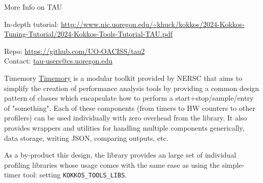 \begin{frame}[fragile]{More Info on TAU}

\begin{center}
	In-depth tutorial: \url{http://www.nic.uoregon.edu/~khuck/kokkos/2024-Kokkos-Tuning-Tutorial/2024-Kokkos-Tools-Tutorial-TAU.pdf} 
\end{center}
	\begin{center} 
        Repo: \url{https://github.com/UO-OACISS/tau2} \\
	Contact: \url{tau-users@cs.uoregon.edu}
	\end{center} 
\end{frame}
\begin{frame}[fragile]{Timemory}
  \href{https://github.com/NERSC/timemory}{Timemory} is a modular toolkit provided by NERSC that aims to
  simplify the creation of performance analysis tools by providing a common design pattern
  of classes which encapsulate how to perform a start+stop/sample/entry of "something". 
  Each of these components (from timers to HW counters to other profilers) can be used 
  individually with zero overhead from the library. 
  It also provides wrappers and utilities for handling multiple components generically, data storage, 
  writing JSON, comparing outputs, etc. 

  \vspace{1em}
  As a by-product this design, the library
  provides an large set of individual profiling libraries whose usage comes with
  the same ease as using the simple-timer tool: setting \texttt{KOKKOS\_TOOLS\_LIBS}. 
%	
%
%
\end{frame}



